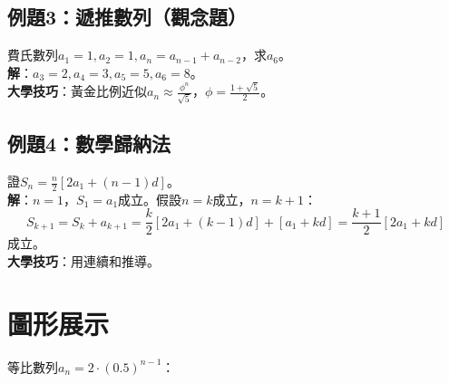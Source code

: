 \subsection{例題3：遞推數列（觀念題）}
費氏數列$a_1 = 1, a_2 = 1, a_n = a_{n-1} + a_{n-2}$，求$a_6$。\\
\textbf{解}：$a_3 = 2, a_4 = 3, a_5 = 5, a_6 = 8$。\\
\textbf{大學技巧}：黃金比例近似$a_n \approx \frac{\phi^n}{\sqrt{5}}$，$\phi = \frac{1 + \sqrt{5}}{2}$。

\subsection{例題4：數學歸納法}
證$S_n = \frac{n}{2} [2a_1 + (n-1)d]$。\\
\textbf{解}：$n = 1$，$S_1 = a_1$成立。假設$n = k$成立，$n = k+1$：
\[
S_{k+1} = S_k + a_{k+1} = \frac{k}{2} [2a_1 + (k-1)d] + [a_1 + kd] = \frac{k+1}{2} [2a_1 + kd]
\]
成立。\\
\textbf{大學技巧}：用連續和推導。

\section{圖形展示}
等比數列$a_n = 2 \cdot (0.5)^{n-1}$：

